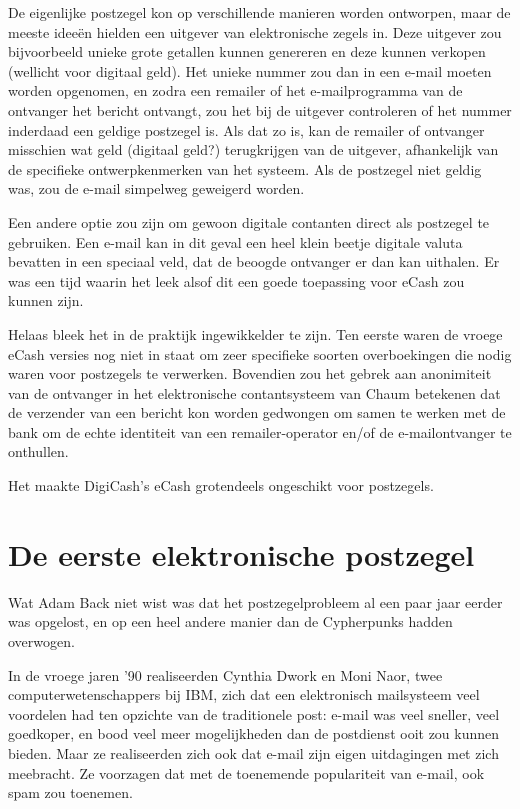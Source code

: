 \documentclass[smalldemyvopaper,11pt,twoside,onecolumn,openright,extrafontsizes,hidelinks]{memoir}
\begin{document}
De eigenlijke postzegel kon op verschillende manieren worden ontworpen,
maar de meeste ideeën hielden een uitgever van elektronische zegels in.
Deze uitgever zou bijvoorbeeld unieke grote getallen kunnen genereren en
deze kunnen verkopen (wellicht voor digitaal geld). Het unieke nummer
zou dan in een e-mail moeten worden opgenomen, en zodra een remailer of
het e-mailprogramma van de ontvanger het bericht ontvangt, zou het bij
de uitgever controleren of het nummer inderdaad een geldige postzegel
is. Als dat zo is, kan de remailer of ontvanger misschien wat geld
(digitaal geld?) terugkrijgen van de uitgever, afhankelijk van de
specifieke ontwerpkenmerken van het systeem. Als de postzegel niet
geldig was, zou de e-mail simpelweg geweigerd worden.

Een andere optie zou zijn om gewoon digitale contanten direct als
postzegel te gebruiken. Een e-mail kan in dit geval een heel klein
beetje digitale valuta bevatten in een speciaal veld, dat de beoogde
ontvanger er dan kan uithalen. Er was een tijd waarin het leek alsof dit
een goede toepassing voor eCash zou kunnen zijn.

Helaas bleek het in de praktijk ingewikkelder te zijn. Ten eerste waren
de vroege eCash versies nog niet in staat om zeer specifieke soorten
overboekingen die nodig waren voor postzegels te verwerken. Bovendien
zou het gebrek aan anonimiteit van de ontvanger in het elektronische
contantsysteem van Chaum betekenen dat de verzender van een bericht kon
worden gedwongen om samen te werken met de bank om de echte identiteit
van een remailer-operator en/of de e-mailontvanger te onthullen.

Het maakte DigiCash's eCash grotendeels ongeschikt voor postzegels.

\section{De eerste elektronische
postzegel}\label{de-eerste-elektronische-postzegel}

Wat Adam Back niet wist was dat het postzegelprobleem al een paar jaar
eerder was opgelost, en op een heel andere manier dan de Cypherpunks
hadden overwogen.

In de vroege jaren '90 realiseerden Cynthia Dwork en Moni Naor, twee
computerwetenschappers bij IBM, zich dat een elektronisch mailsysteem
veel voordelen had ten opzichte van de traditionele post: e-mail was
veel sneller, veel goedkoper, en bood veel meer mogelijkheden dan de
postdienst ooit zou kunnen bieden. Maar ze realiseerden zich ook dat
e-mail zijn eigen uitdagingen met zich meebracht. Ze voorzagen dat met
de toenemende populariteit van e-mail, ook spam zou toenemen.
\end{document}
